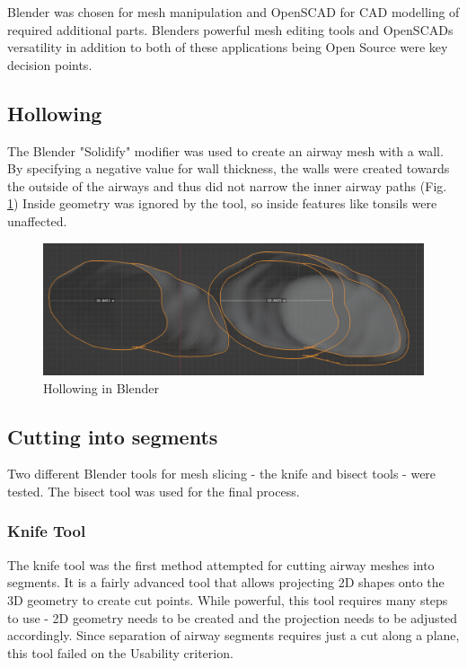 \documentclass[MME,Projekt,english]{twbook}%
\begin{document}
Blender was chosen for mesh manipulation and OpenSCAD for CAD modelling of required additional parts. Blenders powerful mesh editing tools
and OpenSCADs versatility in addition to both of these applications being Open Source were key decision points.

\newpage
\subsection{Hollowing}

The Blender "Solidify" modifier was used to create an airway mesh with a wall. By specifying a negative value for wall thickness,
the walls were created towards the outside of the airways and thus did not narrow the inner airway paths (Fig. \ref{blender-hollowing}) Inside geometry was ignored by the tool,
so inside features like tonsils were unaffected. 

\begin{figure}[!htbp]
	\centering
	\includegraphics[width=1\linewidth]{images/blender-hollowing}
	\caption{Hollowing in Blender}\label{blender-hollowing}
\end{figure}

\subsection{Cutting into segments}

Two different Blender tools for mesh slicing - the knife and bisect tools - were tested. The bisect tool was used for the final process.

\subsubsection{Knife Tool}

The knife tool was the first method attempted for cutting airway meshes into segments. It is a fairly advanced tool
that allows projecting 2D shapes onto the 3D geometry to create cut points. While powerful, this tool requires many steps
to use - 2D geometry needs to be created and the projection needs to be adjusted accordingly. Since separation of airway segments requires
just a cut along a plane, this tool failed on the Usability criterion.
\end{document}
